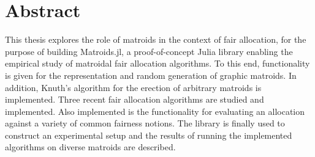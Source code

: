 \documentclass[b5paper]{report}
\begin{document}
\newcommand{\mono}[1]{$\texttt{#1}$}






\chapter*{Abstract}
\thispagestyle{empty}
This thesis explores the role of matroids in the context of fair allocation, for the purpose of building Matroids.jl, a proof-of-concept Julia library enabling the empirical study of matroidal fair allocation algorithms. To this end, functionality is given for the representation and random generation of graphic matroids. In addition, Knuth's algorithm for the erection of arbitrary matroids is implemented. Three recent fair allocation algorithms are studied and implemented. Also implemented is the functionality for evaluating an allocation against a variety of common fairness notions. The library is finally used to construct an experimental setup and the results of running the implemented algorithms on diverse matroids are described.
\end{document}
